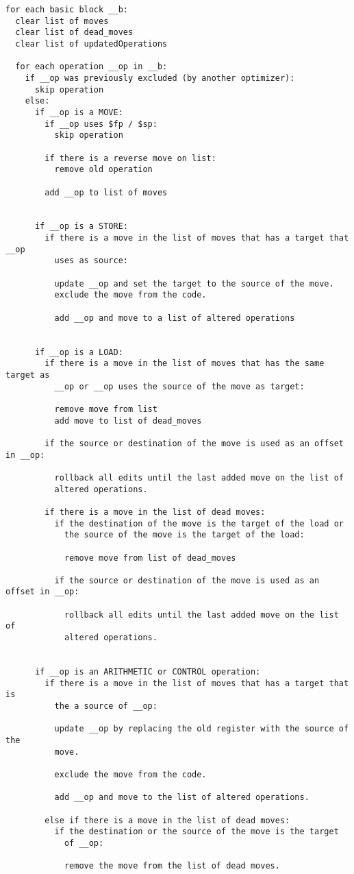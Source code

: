 \documentclass[a4paper,10pt]{article}
\begin{document}
\begin{verbatim}
for each basic block __b:
  clear list of moves
  clear list of dead_moves
  clear list of updatedOperations

  for each operation __op in __b:
    if __op was previously excluded (by another optimizer):
      skip operation
    else:
      if __op is a MOVE:
        if __op uses $fp / $sp:
          skip operation

        if there is a reverse move on list:
          remove old operation

        add __op to list of moves


      if __op is a STORE:
        if there is a move in the list of moves that has a target that __op
          uses as source:

          update __op and set the target to the source of the move.
          exclude the move from the code.

          add __op and move to a list of altered operations


      if __op is a LOAD:
        if there is a move in the list of moves that has the same target as
          __op or __op uses the source of the move as target:

          remove move from list
          add move to list of dead_moves

        if the source or destination of the move is used as an offset in __op:

          rollback all edits until the last added move on the list of
          altered operations.

        if there is a move in the list of dead moves:
          if the destination of the move is the target of the load or
            the source of the move is the target of the load:

            remove move from list of dead_moves

          if the source or destination of the move is used as an offset in __op:

            rollback all edits until the last added move on the list of
            altered operations.

      
      if __op is an ARITHMETIC or CONTROL operation:
        if there is a move in the list of moves that has a target that is
          the a source of __op:

          update __op by replacing the old register with the source of the
          move.

          exclude the move from the code.

          add __op and move to the list of altered operations.

        else if there is a move in the list of dead moves:
          if the destination or the source of the move is the target
            of __op:

            remove the move from the list of dead moves.
\end{verbatim}
\end{document}
